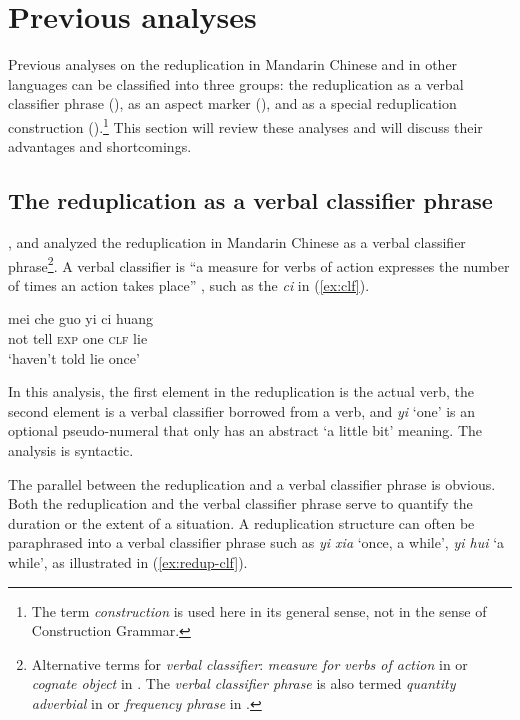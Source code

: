 \section{Previous analyses}\label{sec:prev}

Previous analyses on the reduplication in Mandarin Chinese and in other languages can be classified
into three groups:  the reduplication as a verbal classifier phrase (), as an aspect marker (), and
as a special reduplication construction ().\footnote{The term \textit{construction} is used here in its general sense, not in the sense of Construction Grammar.} 
This section will review these analyses and will discuss their advantages and shortcomings.



\subsection{The reduplication as a verbal classifier phrase}\label{sec:clf}

\citet{Fan1964}, \citet{Chao1968} and \citet{Xiong2016} analyzed the reduplication in Mandarin Chinese
as a verbal classifier phrase\footnote{Alternative terms for \textit{verbal classifier}: \textit{measure for verbs of action} in \citet{Chao1968} or \textit{cognate object} in \citet{Chao1968, Hong1999}.
The \textit{verbal classifier phrase}  is also termed \textit{quantity adverbial} in \citet{LiThompson1981} or \textit{frequency phrase} in \citet{Huangetal2009}.}.
A verbal classifier is ``a measure for verbs of action expresses the number of times an action takes place” \citep[615]{Chao1968}, such as the \textit{ci} in (\ref{ex:clf}). 

\ea\label{ex:clf}
\gll mei che guo yi ci huang\\
not tell \textsc{exp} one \textsc{clf} lie\\ \hfill {\citep[616]{Chao1968}}
\glt `haven't told lie once'
\z

In this analysis, the first element in the reduplication is the actual verb, 
the second element is a verbal classifier borrowed from a verb, 
and \textit{yi} `one' is an optional pseudo-numeral that only has an abstract `a little bit' meaning.
The analysis is syntactic.

The parallel between the reduplication and a verbal classifier phrase is obvious. 
Both the reduplication and the verbal classifier phrase serve to quantify the duration or the extent of a situation. 
A reduplication structure can often be paraphrased into a verbal classifier phrase such as \textit{yi xia} ‘once, a while’, \textit{yi hui} ‘a while’, as illustrated in (\ref{ex:redup-clf}).

